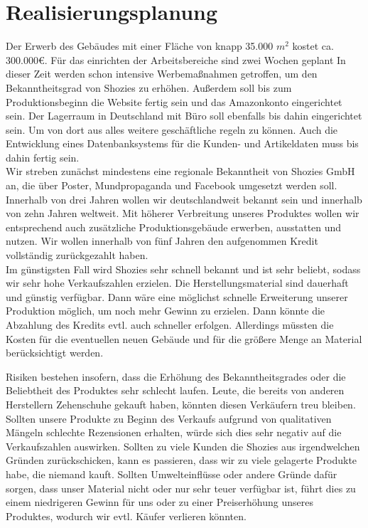 \chapter{Realisierungsplanung}
\label{cha:8}


Der Erwerb des Gebäudes mit einer Fläche von knapp 35.000 $m^{2}$ kostet ca. 300.000€.
Für das einrichten der Arbeitsbereiche sind zwei Wochen geplant In dieser Zeit werden schon intensive Werbemaßnahmen getroffen, um den Bekanntheitsgrad von Shozies zu erhöhen. Außerdem soll bis zum Produktionsbeginn die Website fertig sein und das Amazonkonto eingerichtet sein.
Der Lagerraum in Deutschland mit Büro soll ebenfalls bis dahin eingerichtet sein. Um von dort aus alles weitere geschäftliche regeln zu können. Auch die Entwicklung eines Datenbanksystems für die Kunden- und Artikeldaten muss bis dahin fertig sein.\\
Wir streben zunächst mindestens eine regionale Bekanntheit von Shozies GmbH an, die über Poster, Mundpropaganda und Facebook umgesetzt werden soll. Innerhalb von drei Jahren wollen wir deutschlandweit bekannt sein und innerhalb von zehn Jahren weltweit. Mit höherer Verbreitung unseres Produktes wollen wir entsprechend auch zusätzliche Produktionsgebäude erwerben, ausstatten und nutzen. Wir wollen innerhalb von fünf Jahren den aufgenommen Kredit vollständig zurückgezahlt haben.\\

Im günstigsten Fall wird Shozies sehr schnell bekannt und ist sehr beliebt, sodass wir sehr hohe Verkaufszahlen erzielen. Die Herstellungsmaterial sind dauerhaft und günstig verfügbar. Dann wäre eine möglichst schnelle Erweiterung unserer Produktion möglich, um noch mehr Gewinn zu erzielen. Dann könnte die Abzahlung des Kredits evtl. auch schneller erfolgen. Allerdings müssten die Kosten für die eventuellen neuen Gebäude und für die größere Menge an Material berücksichtigt werden.

Risiken bestehen insofern, dass die Erhöhung des Bekanntheitsgrades oder die Beliebtheit des Produktes sehr schlecht laufen. Leute, die bereits von anderen Herstellern Zehenschuhe gekauft haben, könnten diesen Verkäufern treu bleiben. Sollten unsere Produkte zu Beginn des Verkaufs aufgrund von qualitativen Mängeln schlechte Rezensionen erhalten, würde sich dies sehr negativ auf die Verkaufszahlen auswirken. Sollten zu viele Kunden die Shozies aus irgendwelchen Gründen zurückschicken, kann es passieren, dass wir zu viele gelagerte Produkte habe, die niemand kauft. Sollten Umwelteinflüsse oder andere Gründe dafür sorgen, dass unser Material nicht oder nur sehr teuer verfügbar ist, führt dies zu einem niedrigeren Gewinn für uns oder zu einer Preiserhöhung unseres Produktes, wodurch wir evtl. Käufer verlieren könnten.